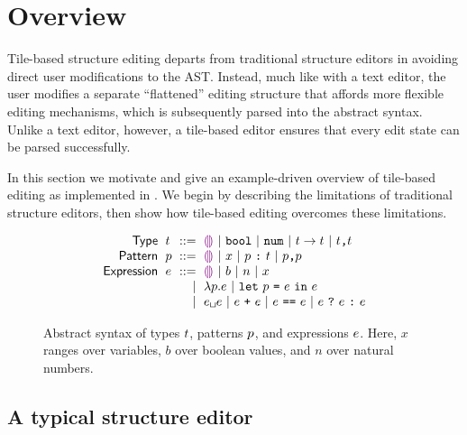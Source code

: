 \section{Overview}\label{sec:overview}

Tile-based structure editing departs from traditional
structure editors in avoiding direct user modifications
to the AST.
Instead, much like with a text editor, the user modifies a separate
``flattened'' editing structure that affords more flexible
editing mechanisms, which is subsequently parsed into the
abstract syntax.
Unlike a text editor, however, a tile-based editor ensures
that every edit state can be parsed successfully.

In this section we motivate and give an example-driven
overview of tile-based editing as implemented
in \tylr. We begin by describing the limitations of
traditional structure editors, then show how tile-based
editing overcomes these limitations.


\begin{figure}
  \vspace{-3px}
  \[
  \arraycolsep=3pt\begin{array}{rlrl}
      \mathsf{Type} & \styp & ::= &
          \shole ~\vert~
          \sbool ~\vert~
          \snum ~\vert~
          \sarr{\styp}{\styp} ~\vert~
          \sprod{\styp}{\styp}\\
      \mathsf{Pattern} & \spat & ::= &
        \shole ~\vert~
        \svar{x} ~\vert~
        \sann{p}{\styp} ~\vert~
        \sprod{\spat}{\spat}\\
      \mathsf{Expression} & \sexp & ::= &
        \shole ~\vert~
        \sboollit{b} ~\vert~
        \snumlit{n} ~\vert~
        \svar{x} \\
      & & \vert &
        \slam{\spat}{\sexp} ~\vert~
        \slet{\spat}{\sexp}{\sexp}\\
      & & \vert &
        \sap{\sexp}{\sexp} ~\vert~
        \splus{\sexp}{\sexp} ~\vert~
        \sequals{\sexp}{\sexp} ~\vert~
        \scond{\sexp}{\sexp}{\sexp}
  \end{array}\]
  \caption{
    Abstract syntax of types $t$, patterns $p$, and expressions $e$.
    Here, $x$ ranges over variables, $b$ over boolean values, and $n$ over natural numbers.
  }
  \label{fig:language-syntax}
\end{figure}


\subsection{A typical structure editor} \label{sec:simple-editor}

